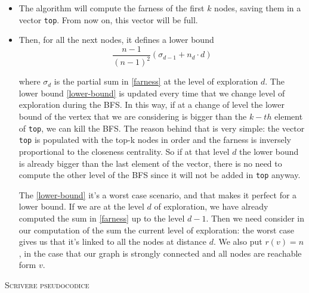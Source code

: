 \begin{itemize}
    \item The algorithm will compute the farness of the first $k$ nodes, saving them in a vector \texttt{top}. From now on, this vector will be full.

    \item Then, for all the next nodes, it defines a lower bound
    \begin{equation}\label{lower-bound}
        \frac{n-1}{(n-1)^2} (\sigma_{d-1} + n_d \cdot d)
    \end{equation}

    where $\sigma_d$ is the partial sum in \eqref{farness} at the level of exploration $d$. The lower bound \eqref{lower-bound} is updated every time that we change level of exploration during the BFS. In this way, if at a change of level the lower bound of the vertex that we are considering is bigger than the $k-th$ element of \texttt{top}, we can kill the BFS. The reason behind that is very simple: the vector \texttt{top} is populated with the top-k nodes in order and the farness is inversely proportional to the closeness centrality. So if at that level $d$ the lower bound is already bigger than the last element of the vector, there is no need to compute the other level of the BFS since it will not be added in \texttt{top} anyway. \s

    The \eqref{lower-bound} it's a worst case scenario, and that makes it perfect for a lower bound. If we are at the level $d$ of exploration, we have already computed the sum in \eqref{farness} up to the level $d-1$. Then we need consider in our computation of the sum the current level of exploration: the worst case gives us that it's linked to all the nodes at distance $d$. We also put $r(v)=n$, in the case that our graph is strongly connected and all nodes are reachable form $v$.
\end{itemize}

\textsc{Scrivere pseudocodice}




